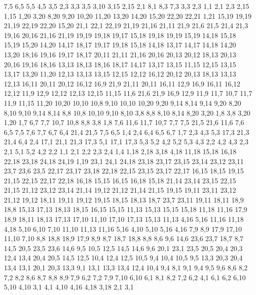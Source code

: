 7,5
6,5
5,5
4,5
3,5
%
2,3
3,3
3,5
3,10
3,15
2,15
%
2,1
8,1
8,3
7,3
3,3
2,3
%
1,1
2,1
2,3
2,15
1,15
1,20
3,20
8,20
9,20
10,20
11,20
13,20
14,20
15,20
22,20
22,21
1,21
%
15,19
19,19
21,19
22,19
22,20
15,20
%
21,1
22,1
22,19
21,19
21,16
21,11
21,9
21,6
21,5
21,4
21,3
%
19,16
20,16
21,16
21,19
19,19
19,18
19,17
%
15,18
19,18
19,19
15,19
%
14,18
15,18
15,19
15,20
14,20
%
14,17
18,17
19,17
19,18
15,18
14,18
%
13,17
14,17
14,18
14,20
13,20
%
18,16
19,16
19,17
18,17
%
20,11
21,11
21,16
20,16
20,13
20,12
%
18,13
20,13
20,16
19,16
18,16
%
13,13
18,13
18,16
18,17
14,17
13,17
13,15
%
11,15
12,15
13,15
13,17
13,20
11,20
%
12,13
13,13
13,15
12,15
%
12,12
16,12
20,12
20,13
18,13
13,13
12,13
%
16,11
20,11
20,12
16,12
%
16,9
21,9
21,11
20,11
16,11
%
12,9
16,9
16,11
16,12
12,12
%
11,9
12,9
12,12
12,13
12,15
11,15
%
11,6
21,6
21,9
16,9
12,9
11,9
11,7
%
10,7
11,7
11,9
11,15
11,20
10,20
10,10
10,8
%
9,10
10,10
10,20
9,20
9,14
%
8,14
9,14
9,20
8,20
%
8,10
9,10
9,14
8,14
%
8,8
10,8
10,10
9,10
8,10
%
3,8
8,8
8,10
8,14
8,20
3,20
%
1,8
3,8
3,20
1,20
%
1,7
6,7
7,7
10,7
10,8
8,8
3,8
1,8
%
7,6
11,6
11,7
10,7
7,7
%
7,5
21,5
21,6
11,6
7,6
%
6,5
7,5
7,6
7,7
6,7
%
6,4
21,4
21,5
7,5
6,5
%
1,4
2,4
6,4
6,5
6,7
1,7
%
2,3
4,3
5,3
17,3
21,3
21,4
6,4
2,4
%
17,1
21,1
21,3
17,3
%
5,1
17,1
17,3
5,3
5,2
%
4,2
5,2
5,3
4,3
%
2,2
4,2
4,3
2,3
%
2,1
5,1
5,2
4,2
2,2
%
1,1
2,1
2,2
2,3
2,4
1,4
1,18
2,18
3,18
4,18
11,18
15,18
16,18
22,18
23,18
24,18
24,19
1,19
%
23,1
24,1
24,18
23,18
23,17
23,15
23,14
23,12
23,11
23,7
23,6
23,5
%
22,17
23,17
23,18
22,18
%
22,15
23,15
23,17
22,17
%
16,15
18,15
19,15
21,15
22,15
22,17
22,18
16,18
%
15,15
16,15
16,18
15,18
%
21,14
23,14
23,15
22,15
21,15
%
21,12
23,12
23,14
21,14
%
19,12
21,12
21,14
21,15
19,15
%
19,11
23,11
23,12
21,12
19,12
%
18,11
19,11
19,12
19,15
18,15
18,13
%
18,7
23,7
23,11
19,11
18,11
18,9
18,8
%
15,13
17,13
18,13
18,15
16,15
15,15
%
11,13
15,13
15,15
15,18
11,18
11,16
%
17,9
18,9
18,11
18,13
17,13
17,10
%
11,10
17,10
17,13
15,13
11,13
%
4,16
5,16
11,16
11,18
4,18
%
5,10
6,10
7,10
11,10
11,13
11,16
5,16
%
4,10
5,10
5,16
4,16
%
7,9
8,9
17,9
17,10
11,10
7,10
%
8,8
18,8
18,9
17,9
8,9
%
8,7
18,7
18,8
8,8
%
8,6
9,6
14,6
23,6
23,7
18,7
8,7
%
14,5
20,5
23,5
23,6
14,6
%
9,5
10,5
12,5
14,5
14,6
9,6
%
20,1
23,1
23,5
20,5
20,4
20,3
%
12,4
13,4
20,4
20,5
14,5
12,5
%
10,4
12,4
12,5
10,5
%
9,4
10,4
10,5
9,5
%
13,3
20,3
20,4
13,4
%
13,1
20,1
20,3
13,3
%
9,1
13,1
13,3
13,4
12,4
10,4
9,4
%
8,1
9,1
9,4
9,5
9,6
8,6
8,2
%
7,2
8,2
8,6
8,7
8,8
8,9
7,9
%
6,2
7,2
7,9
7,10
6,10
%
6,1
8,1
8,2
7,2
6,2
%
4,1
6,1
6,2
6,10
5,10
4,10
%
3,1
4,1
4,10
4,16
4,18
3,18
%
2,1
3,1
